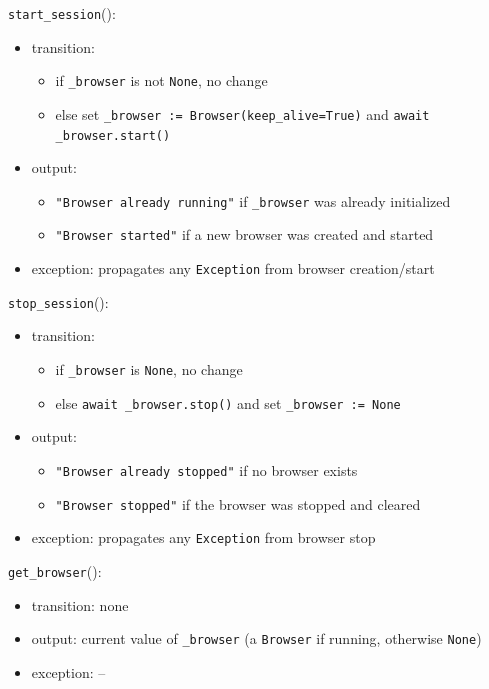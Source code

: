 \documentclass[12pt, titlepage]{article}
\begin{document}
\noindent \texttt{start\_session}():
\begin{itemize}
  \item transition:
    \begin{itemize}
      \item if \texttt{\_browser} is not \texttt{None}, no change
      \item else set \texttt{\_browser := Browser(keep\_alive=True)} and \texttt{await \_browser.start()}
    \end{itemize}
  \item output:
    \begin{itemize}
      \item \texttt{"Browser already running"} if \texttt{\_browser} was already initialized
      \item \texttt{"Browser started"} if a new browser was created and started
    \end{itemize}
  \item exception: propagates any \texttt{Exception} from browser creation/start
\end{itemize}

\noindent \texttt{stop\_session}():
\begin{itemize}
  \item transition:
    \begin{itemize}
      \item if \texttt{\_browser} is \texttt{None}, no change
      \item else \texttt{await \_browser.stop()} and set \texttt{\_browser := None}
    \end{itemize}
  \item output:
    \begin{itemize}
      \item \texttt{"Browser already stopped"} if no browser exists
      \item \texttt{"Browser stopped"} if the browser was stopped and cleared
    \end{itemize}
  \item exception: propagates any \texttt{Exception} from browser stop
\end{itemize}

\noindent \texttt{get\_browser}():
\begin{itemize}
  \item transition: none
  \item output: current value of \texttt{\_browser} (a \texttt{Browser} if running, otherwise \texttt{None})
  \item exception: --
\end{itemize}
\end{document}
